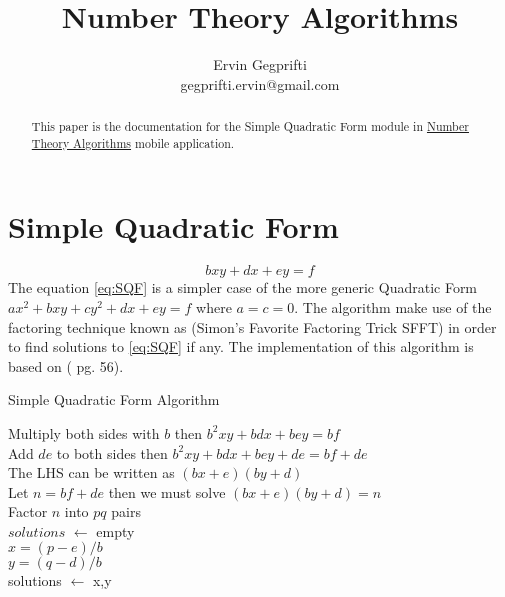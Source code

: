 \documentclass[12pt,oneside,a4paper]{article}
\title{Number Theory Algorithms}
\author{Ervin Gegprifti \\ [6pt]
	gegprifti.ervin@gmail.com}
\date{}
\begin{document}
\pagecolor{bgcolor}	

\maketitle

\begin{abstract}
	This paper is the documentation for the Simple Quadratic Form module in \href{https://play.google.com/store/apps/details?id=com.gegprifti.android.numbertheoryalgorithms}{Number Theory Algorithms} mobile application.
\end{abstract}

\section*{Simple Quadratic Form}
\begin{equation} \label{eq:SQF}
	bxy+dx+ey=f
\end{equation}	
The equation \eqref{eq:SQF} is a simpler case of the more generic Quadratic Form $ax^2+bxy+cy^2+dx+ey=f$ where $a=c=0$. The algorithm make use of the factoring technique known as (Simon's Favorite Factoring Trick SFFT) in order to find solutions to \eqref{eq:SQF} if any. The implementation of this algorithm is based on (\cite{yan2002number} pg. 56). \\




\begin{algorithm}[H]
	\caption{Simple Quadratic Form Algorithm}
	\DontPrintSemicolon
	\SetAlgoLined
	
	\BlankLine

	Multiply both sides with $b$ then $b^2xy+bdx+bey=bf$ \\
	Add $de$ to both sides then $b^2xy+bdx+bey+de=bf+de$ \\
	The LHS can be written as $(bx+e)(by+d)$ \\
	Let $n=bf+de$ then we must solve $(bx+e)(by+d)=n$ \\
	Factor $n$ into $pq$ pairs \\
	$solutions$ $\leftarrow$ empty \\
	 {
		{	
			$x=(p-e)/b$ \\ 
			$y=(q-d)/b$ \\
			solutions $\leftarrow$ x,y
		}
		{
		}
	}

\end{algorithm}
\end{document}
